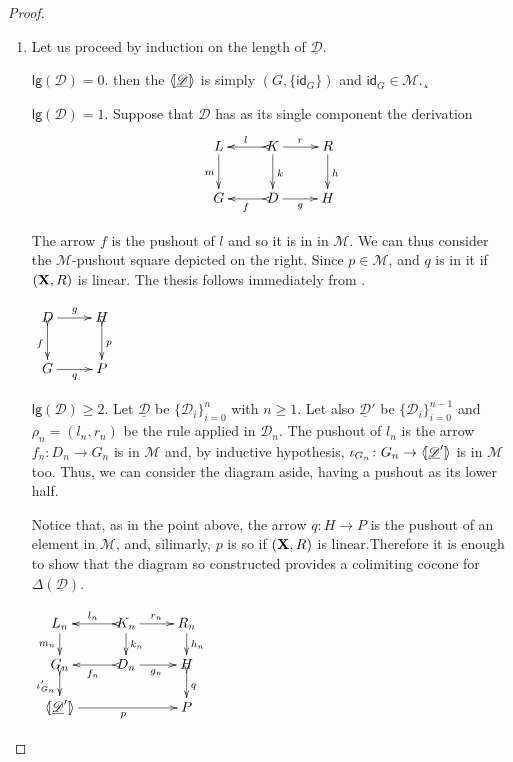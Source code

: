 \documentclass[a4paper,UKenglish,cleveref,pdftex, thm-restate,numberwithinsect,anonymous]{lipics}
\newcommand{\id}[1]{\mathsf{id}_{#1}}
\def\R{\mathsf{R}}
\def\X{\textbf {\textup{X}}}
\def\G{\textbf {\textup{G}}}
\newcommand{\dder}[1]{\mathscr{#1}}
\newcommand{\der}[1]{\underline{\dder{#1}}}
\newcommand{\lpro}{\langle \hspace{-1.85pt}[}
\newcommand{\rpro}{]\hspace{-1.85pt}\rangle}
\newcommand{\tpro}[1]{\lpro \der{#1}\rpro}
\newcommand{\lgh}[0]{\mathsf{lg}}
\begin{document}
\begin{proof}
	\begin{enumerate}
		\item Let us proceed by induction on the length of $\der{D}$.
		
		
		\smallskip \noindent
		$\lgh(\dder{D})=0$. then the
		$\tpro{\dder{D}}$ is simply $(G, \{\id{G}\})$ and
		$\id{G}\in \mathcal{M}$.¸
		
		\smallskip \noindent
		$\lgh(\dder{D})=1$. Suppose that $\dder{D}$
		has as its single component the derivation
		\[\xymatrix{L \ar[d]_{m}& K \ar[d]^{k}\ar@{>->}[l]_{l} \ar[r]^{r} & R \ar[d]^{h} \\G& \ar@{>->}[l]^{f} D \ar[r]_{g}& H  \\}\]
	
		\parbox{11cm}{The arrow $f$ is  the pushout of $l$ and so it is in in $\mathcal{M}$. We can thus consider the $\mathcal{M}$-pushout square depicted on the right.
		Since $p\in \mathcal{M}$, and $q$ is in it if $(\X, \R)$ is linear. The thesis follows immediately from .}
		\parbox{2cm}{
			$\xymatrix{D \ar@{>->}[d]_{f} \ar[r]^{g} & H \ar@{>->}[d]^{p} \\G \ar[r]_{q}& P }$}
		
		\smallskip \noindent
	\parbox{9cm}{$\lgh(\dder{D})\geq 2$. Let $\der{D}$ be
		$\{\dder{D}_i\}_{i=0}^n$ with $n\geq 1$. Let also $\der{D}'$ be
		$\{\dder{D}_i\}^{n-1}_{i=0}$ and $\rho_n=(l_n, r_n)$ be the rule
		applied in $\dder{D}_n$. The pushout of $l_n$ is the arrow
		$f_n\colon D_n\to G_n$ is in $\mathcal{M}$ and, by inductive
		hypothesis, $\iota_{G_{n}}\colon G_{n}\to \lpro \der{D}'\rpro$ is
		in $\mathcal{M}$ too. Thus, we can consider the diagram aside,
		having a pushout as its lower half.

\smallskip \noindent 
\parbox{13.45cm} {\hspace{15pt}
		Notice that, as in the point above, the arrow $q\colon H\to P$ is the pushout of an element in $\mathcal{M}$, and, silimarly, $p$ is so if $(\X, \R)$ is linear.Therefore it is enough to show that the diagram so constructed provides a colimiting cocone for $\Delta(\der{D})$.}}
		\parbox{4cm}{\vspace{-1.5cm}$\xymatrix@R=15pt{L_n \ar[d]_{m_{n}}& K_{n} \ar[d]^{k_{n}}\ar@{>->}[l]_{l_{n}} \ar[r]^{r_{n}} & R_{n} \ar[d]^{h_n} \\G_{n} \ar@{>->}[d]_{\iota'_{G_{n}}}& \ar@{>->}[l]^{f_n} D_n \ar[r]_{g_n}& H  \ar@{>->}[d]^{q}\\ \lpro \der{D}' \ar[rr]_{p}\rpro && P}$}
		

\end{enumerate}
\end{proof}
\end{document}
